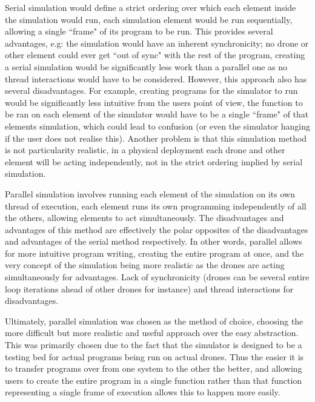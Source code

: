 			Serial simulation would define a strict ordering over which each element inside the simulation would run, each simulation element would be run
			sequentially, allowing a single ``frame" of its program to be run. This provides several advantages, e.g: the simulation would
			have an inherent synchronicity; no drone or other element could ever get ``out of sync" with the rest of the program, creating a
			serial simulation would be significantly less work than a parallel one as no thread interactions would have to be considered. However,
			this approach also has several disadvantages. For example, creating programs for the simulator to run would be significantly less
			intuitive from the users point of view, the function to be ran on each element of the simulator would have to be a single ``frame"
			of that elements simulation, which could lead to confusion (or even the simulator hanging if the user does not realise this). Another
			problem is that this simulation method is not particularity realistic, in a physical deployment each drone and other element will be acting
			independently, not in the strict ordering implied by serial simulation.

			Parallel simulation involves running each element of the simulation on its own thread of execution, each element runs its own programming
			independently of all the others, allowing elements to act simultaneously. The disadvantages and advantages of this method are effectively the
			polar opposites of the disadvantages and advantages of the serial method respectively. In other words, parallel allows for more intuitive
			program writing, creating the entire program at once, and the very concept of the simulation being more realistic as the drones are acting
			simultaneously for advantages. Lack of synchronicity (drones can be several entire loop iterations ahead of other drones for instance) and
			thread interactions for disadvantages.

			Ultimately, parallel simulation was chosen as the method of choice, choosing the more difficult but more realistic and useful approach over
			the easy abstraction. This was primarily chosen due to the fact that the simulator is designed to be a testing bed for actual programs being run
			on actual drones. Thus the easier it is to transfer programs over from one system to the other the better, and allowing users to create the entire
			program in a single function rather than that function representing a single frame of execution allows this to happen more easily.

